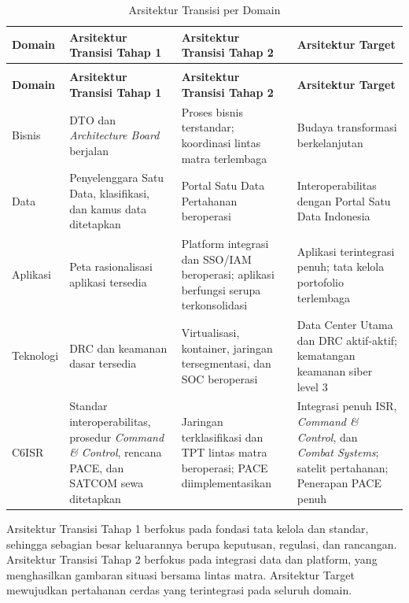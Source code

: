 {\small
\begin{longtable}{@{}>{\raggedright\arraybackslash}p{}>{\raggedright\arraybackslash}p{}>{\raggedright\arraybackslash}p{}>{\raggedright\arraybackslash}p{}@{}}
\caption{Arsitektur Transisi per Domain}
\label{tab:d4-42}\\
\toprule
\textbf{Domain} & \textbf{Arsitektur Transisi Tahap 1} & \textbf{Arsitektur Transisi Tahap 2} & \textbf{Arsitektur Target}\\
\midrule
\endfirsthead
\multicolumn{4}{@{}l}{\small\itshape \tablename\ \thetable{} (lanjutan)}\\
\toprule
\textbf{Domain} & \textbf{Arsitektur Transisi Tahap 1} & \textbf{Arsitektur Transisi Tahap 2} & \textbf{Arsitektur Target}\\
\midrule
\endhead
\bottomrule
\endlastfoot
Bisnis & DTO dan \textit{Architecture Board} berjalan & Proses bisnis terstandar; koordinasi lintas matra terlembaga & Budaya transformasi berkelanjutan\\
Data & Penyelenggara Satu Data, klasifikasi, dan kamus data ditetapkan & Portal Satu Data Pertahanan beroperasi & Interoperabilitas dengan Portal Satu Data Indonesia\\
Aplikasi & Peta rasionalisasi aplikasi tersedia & Platform integrasi dan SSO/IAM beroperasi; aplikasi berfungsi serupa terkonsolidasi & Aplikasi terintegrasi penuh; tata kelola portofolio terlembaga\\
Teknologi & DRC dan keamanan dasar tersedia & Virtualisasi, kontainer, jaringan tersegmentasi, dan SOC beroperasi & Data Center Utama dan DRC aktif-aktif; kematangan keamanan siber level 3\\
C6ISR & Standar interoperabilitas, prosedur \textit{Command \& Control}, rencana PACE, dan SATCOM sewa ditetapkan & Jaringan terklasifikasi dan TPT lintas matra beroperasi; PACE diimplementasikan & Integrasi penuh ISR, \textit{Command \& Control}, dan \textit{Combat Systems}; satelit pertahanan; Penerapan PACE penuh\\
\end{longtable}
}

Arsitektur Transisi Tahap 1 berfokus pada fondasi tata kelola dan standar, sehingga sebagian besar keluarannya berupa keputusan, regulasi, dan rancangan. Arsitektur Transisi Tahap 2 berfokus pada integrasi data dan platform, yang menghasilkan gambaran situasi bersama lintas matra. Arsitektur Target mewujudkan pertahanan cerdas yang terintegrasi pada seluruh domain.

